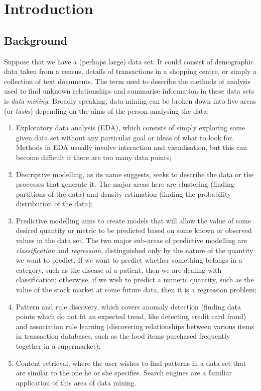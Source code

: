 \chapter{Introduction}

\section{Background}
Suppose that we have a (perhaps large) data set. It could consist of
demographic data taken from a census, details of transactions in a shopping
centre, or simply a collection of text documents. The term used to describe
the methods of analysis used to find unknown relationships and summarise
information in these data sets is \textit{data mining}. Broadly speaking,
data mining can be broken down into five areas (or \textit{tasks}) depending
on the aims of the person analysing the data:

\begin{enumerate}
\item Exploratory data analysis (EDA), which consists of simply exploring some
given data set without any particular goal or ideas of what to look for.
Methods in EDA usually involve interaction and visualisation, but this can
become difficult if there are too many data points;
\item Descriptive modelling, as its name suggests, seeks to describe the data
or the processes that generate it. The major areas here are clustering (finding
partitions of the data) and density estimation (finding the probability
distribution of the data);
\item Predictive modelling aims to create models that will allow the value of
some desired quantity or metric to be predicted based on some known or observed
values in the data set. The two major sub-areas of predictive modelling are
\textit{classification} and \textit{regression}, distinguished only by the
nature of the quantity we want to predict. If we want to predict whether
something belongs in a category, such as the disease of a patient, then we
are dealing with classification; otherwise, if we wish to predict a numeric
quantity, such as the value of the stock market at some future data, then
it is a regression problem;
\item Pattern and rule discovery, which covers anomaly detection (finding data
points which do not fit an expected trend, like detecting credit card fraud)
and association rule learning (discovering relationships between various items
in transaction databases, such as the food items purchased frequently together
in a supermarket);
\item Content retrieval, where the user wishes to find patterns in a data set
that are similar to the one he or she specifies. Search engines are a familiar
application of this area of data mining.
\end{enumerate}

